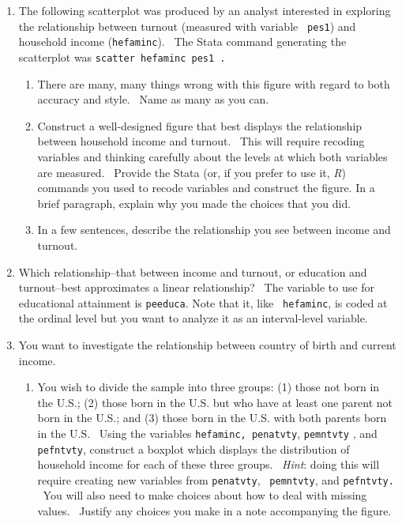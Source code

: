 \documentclass[11pt]{article}
\begin{document}
\begin{enumerate}
\item The following scatterplot was produced by an analyst interested in
exploring the relationship between turnout (measured with variable \texttt{%
pes1}) and household income (\texttt{hefaminc}). \ The Stata command
generating the scatterplot was \texttt{scatter hefaminc pes1 .}

\bigskip

\begin{enumerate}
\item There are many, many things wrong with this figure with regard to both
accuracy and style. \ Name as many as you can.\bigskip

\item Construct a well-designed figure that best displays the relationship
between household income and turnout. \ This will require recoding variables
and thinking carefully about the levels at which both variables are
measured. \ Provide the Stata (or, if you prefer to use it, \textit{R})
commands you used to recode variables and construct the figure. In a brief
paragraph, explain why you made the choices that you did.\bigskip

\item In a few sentences, describe the relationship you see between income
and turnout.\bigskip
\end{enumerate}

\item Which relationship--that between income and turnout, or education and
turnout--best approximates a linear relationship? \ The variable to use for
educational attainment is \texttt{peeduca}. Note that it, like \texttt{%
hefaminc}, is coded at the ordinal level but you want to analyze it as an
interval-level variable. \ \bigskip

\item You want to investigate the relationship between country of birth and
current income. \ 

\begin{enumerate}
\item You wish to divide the sample into three groups: (1) those not born in
the U.S.; (2) those born in the U.S. but who have at least one parent not
born in the U.S.; and (3) those born in the U.S. with both parents born in
the U.S. \ Using the variables \texttt{hefaminc, penatvty}, \texttt{pemntvty}%
, and \texttt{pefntvty}, construct a boxplot which displays the distribution
of household income for each of these three groups. \ \textit{Hint}: doing
this will require creating new variables from \texttt{penatvty}, \texttt{%
pemntvty}, and \texttt{pefntvty.} \ You will also need to make choices about
how to deal with missing values. \ Justify any choices you make in a note
accompanying the figure.\bigskip


\end{enumerate}
\end{enumerate}
\end{document}
